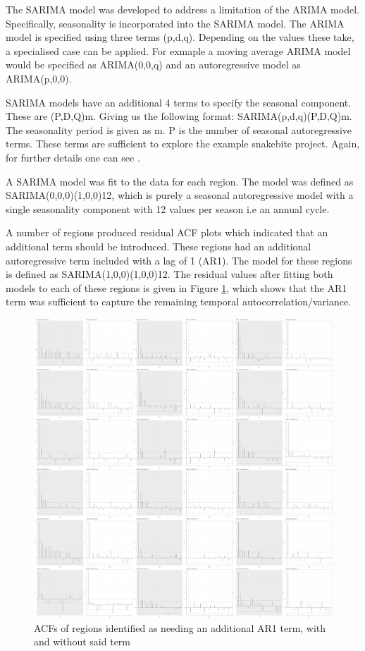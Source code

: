 \documentclass{article}
\begin{document}
The SARIMA model was developed to address a limitation of the ARIMA model. Specifically, seasonality is incorporated into the SARIMA model. The ARIMA model is specified using three terms (p,d,q). Depending on the values these take, a specialised case can be applied. For exmaple a moving average ARIMA model would be specified as ARIMA(0,0,q) and an autoregressive model as ARIMA(p,0,0).

SARIMA models have an additional 4 terms to specify the seasonal component. These are (P,D,Q)m. Giving us the following format: SARIMA(p,d,q)(P,D,Q)m. The seasonality period is given as m. P is the number of seasonal autoregressive terms. These terms are sufficient to explore the example snakebite project. Again, for further details one can see \cite{damaTimeSeriesAnalysis2021}.

A SARIMA model was fit to the data for each region. The model was defined as SARIMA(0,0,0)(1,0,0)12, which is purely a seasonal autoregressive model with a single seasonality component with 12 values per season i.e an annual cycle.

A number of regions produced residual ACF plots which indicated that an additional term should be introduced. These regions had an additional autoregressive term included with a lag of 1 (AR1). The model for these regions is defined as SARIMA(1,0,0)(1,0,0)12. The residual values after fitting both models to each of these regions is given in Figure \ref{fig:ar1regions}, which shows that the AR1 term was sufficient to capture the remaining temporal autocorrelation/variance. %

\begin{figure}[h]
    \centering
    \includegraphics[scale=0.06]{images/ar1regions.png}
    \caption{ACFs of regions identified as needing an additional AR1 term, with and without said term}
    \label{fig:ar1regions}
\end{figure}
\end{document}
